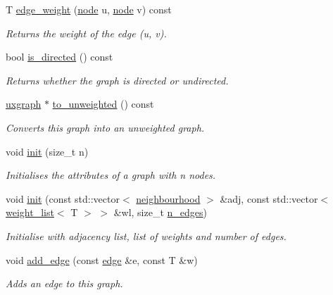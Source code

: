 \begin{DoxyCompactItemize}
T \hyperlink{classlgraph_1_1wugraph_a38ed0dfad1c531dd3e6fc217cc061c2d}{edge\+\_\+weight} (\hyperlink{namespacelgraph_a397169dd66adf725210a30fb7251773e}{node} u, \hyperlink{namespacelgraph_a397169dd66adf725210a30fb7251773e}{node} v) const
\begin{DoxyCompactList}\small\item\em Returns the weight of the edge ({\itshape u}, {\itshape v}). \end{DoxyCompactList}\item 
bool \hyperlink{classlgraph_1_1wugraph_a1614f4e23aa04055c64816c001cd093d}{is\+\_\+directed} () const
\begin{DoxyCompactList}\small\item\em Returns whether the graph is directed or undirected. \end{DoxyCompactList}\item 
\hyperlink{classlgraph_1_1uxgraph}{uxgraph} $\ast$ \hyperlink{classlgraph_1_1wugraph_af5a08c0b6bc0393abbae31c16a364f62}{to\+\_\+unweighted} () const
\begin{DoxyCompactList}\small\item\em Converts this graph into an unweighted graph. \end{DoxyCompactList}\item 
void \hyperlink{classlgraph_1_1wxgraph_aa09f37bf4a34a0f4f002587203df0125}{init} (size\+\_\+t n)
\begin{DoxyCompactList}\small\item\em Initialises the attributes of a graph with {\itshape n} nodes. \end{DoxyCompactList}\item 
void \hyperlink{classlgraph_1_1wxgraph_a851ab43d7658c185831413394ef915a9}{init} (const std\+::vector$<$ \hyperlink{namespacelgraph_a052e7766c13f3a43cec0aec8173fdede}{neighbourhood} $>$ \&adj, const std\+::vector$<$ \hyperlink{namespacelgraph_a1e0fd5ef0a78b2a92da48adbed265cb6}{weight\+\_\+list}$<$ T $>$ $>$ \&wl, size\+\_\+t \hyperlink{classlgraph_1_1xxgraph_af00bce8b07a42754601d1e3bebe2c1fa}{n\+\_\+edges})
\begin{DoxyCompactList}\small\item\em Initialise with adjacency list, list of weights and number of edges. \end{DoxyCompactList}\item 
void \hyperlink{classlgraph_1_1wxgraph_a6b2aab113f6ce118ff437c6c182d9c6c}{add\+\_\+edge} (const \hyperlink{namespacelgraph_a76bd7d50719f03de7a85db259d80d572}{edge} \&e, const T \&w)
\begin{DoxyCompactList}\small\item\em Adds an edge to this graph. \end{DoxyCompactList}\item 

\end{DoxyCompactItemize}

